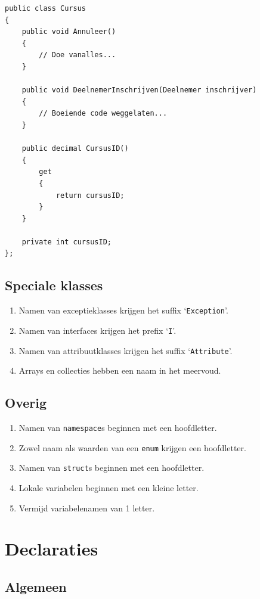 \documentclass[a4paper,11pt]{article}
\begin{document}
\begin{lstlisting}[float,caption=Naamgeving klasses]
public class Cursus
{
	public void Annuleer()
	{
		// Doe vanalles...
	}

	public void DeelnemerInschrijven(Deelnemer inschrijver)
	{
		// Boeiende code weggelaten...
	}

	public decimal CursusID()
	{
		get
		{
			return cursusID;
		}
	}

	private int cursusID;
};
\end{lstlisting}

\subsection{Speciale klasses}

\begin{enumerate}[resume]
\item Namen van exceptieklasses krijgen het suffix `\lstinline !Exception!'.
\item Namen van interfaces krijgen het prefix `\lstinline !I!'.
\item Namen van attribuutklasses krijgen het suffix `\lstinline !Attribute!'.
\item Arrays en collecties hebben een naam in het meervoud.
\end{enumerate}

\subsection{Overig}

\begin{enumerate}[resume]
\item Namen van \lstinline !namespace!s beginnen met een hoofdletter.
\item Zowel naam als waarden van een \lstinline !enum! krijgen een hoofdletter.
\item Namen van \lstinline !struct!s beginnen met een hoofdletter.
\item Lokale variabelen beginnen met een kleine letter.
\item Vermijd variabelenamen van 1 letter.
\end{enumerate}

\section{Declaraties}

\subsection{Algemeen}
\end{document}
